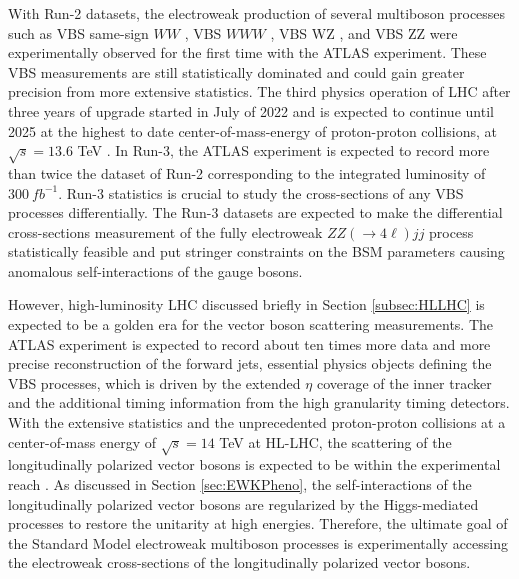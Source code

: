 With Run-2 datasets, the electroweak production of several multiboson processes such as VBS same-sign $WW$ \cite{EWk_ssWW}, VBS $WWW$ \cite{EWK_WWW}, VBS WZ \cite{EWK_WZ}, and VBS ZZ \cite{ATLASZZjj} were experimentally observed for the first time with the ATLAS experiment. These VBS measurements are still statistically dominated and could gain greater precision from more extensive statistics. The third physics operation of LHC after three years of upgrade started in July of 2022 and is expected to continue until 2025 at the highest to date center-of-mass-energy of proton-proton collisions, at $\sqrt{s}=13.6$ TeV \cite{Run3}. In Run-3, the ATLAS experiment is expected to record more than twice the dataset of Run-2 corresponding to the integrated luminosity of $300 ~fb^{-1}$. Run-3 statistics is crucial to study the cross-sections of any VBS processes differentially. The Run-3 datasets are expected to make the differential cross-sections measurement of the fully electroweak $ZZ(\rightarrow 4\ell) jj$ process statistically feasible and put stringer constraints on the BSM parameters causing anomalous self-interactions of the gauge bosons. 

However, high-luminosity LHC discussed briefly in Section \ref{subsec:HLLHC} is expected to be a golden era for the vector boson scattering measurements. The ATLAS experiment is expected to record about ten times more data and more precise reconstruction of the forward jets, essential physics objects defining the VBS processes, which is driven by the extended $\eta$ coverage of the inner tracker and the additional timing information from the high granularity timing detectors. With the extensive statistics and the unprecedented proton-proton collisions at a center-of-mass energy of $\sqrt{s}=14$ TeV at HL-LHC, the scattering of the longitudinally polarized vector bosons is expected to be within the experimental reach \cite{ssWW_HLLHCProspects}. As discussed in Section \ref{sec:EWKPheno}, the self-interactions of the longitudinally polarized vector bosons are regularized by the Higgs-mediated processes to restore the unitarity at high energies. Therefore, the ultimate goal of the Standard Model electroweak multiboson processes is experimentally accessing the electroweak cross-sections of the longitudinally polarized vector bosons.